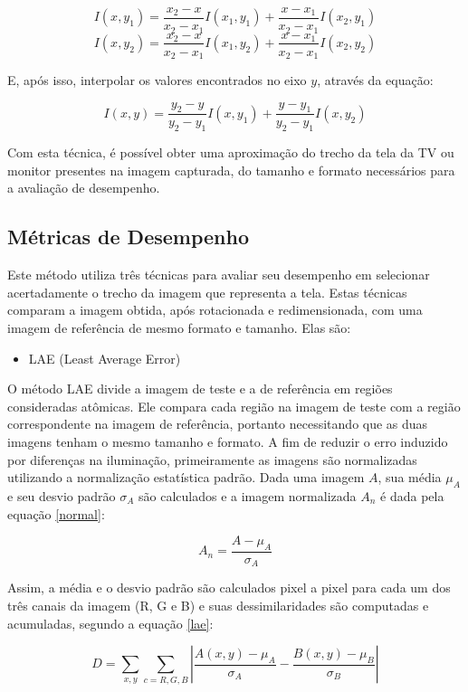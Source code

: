 $$ I(x,y_1) = \frac{x_2-x}{x_2-x_1}I(x_1,y_1) + \frac{x-x_1}{x_2-x_1}I(x_2,y_1) $$
$$ I(x,y_2) = \frac{x_2-x}{x_2-x_1}I(x_1,y_2) + \frac{x-x_1}{x_2-x_1}I(x_2,y_2) $$

E, após isso, interpolar os valores encontrados no eixo $y$, através da equação:

$$ I(x,y) = \frac{y_2-y}{y_2-y_1}I(x,y_1) + \frac{y-y_1}{y_2-y_1}I(x,y_2)$$

Com esta técnica, é possível obter uma aproximação do trecho da tela da TV ou monitor presentes na imagem capturada, do tamanho e formato necessários para a avaliação de desempenho.

\subsection{Métricas de Desempenho}

Este método utiliza três técnicas para avaliar seu desempenho em selecionar acertadamente o trecho da imagem que representa a tela. Estas técnicas comparam a imagem obtida, após rotacionada e redimensionada, com uma imagem de referência de mesmo formato e tamanho. Elas são:

\begin{itemize}
\item LAE (Least Average Error)
\end{itemize}


O método LAE divide a imagem de teste e a de referência em regiões consideradas atômicas. Ele compara cada região na imagem de teste com a região correspondente na imagem de referência, portanto necessitando que as duas imagens tenham o mesmo tamanho e formato. A fim de reduzir o erro induzido por diferenças na iluminação, primeiramente as imagens são normalizadas utilizando a normalização estatística padrão. Dada uma imagem $A$, sua média $\mu_A$ e seu desvio padrão $\sigma_A$ são calculados e a imagem normalizada $A_n$ é dada pela equação \ref{normal}:

\begin{equation}
A_n = \frac{A-\mu_A}{\sigma_A} \label{normal}
\end{equation}

Assim, a média e o desvio padrão são calculados pixel a pixel para cada um dos três canais da imagem (R, G e B) e suas dessimilaridades são computadas e acumuladas, segundo a equação \ref{lae}:

\begin{equation}
D = \sum_ {x,y}^{} \sum_{c=R,G,B}^{} \left | \frac{A(x,y)-\mu _A}{\sigma _A} - \frac{B(x,y)-\mu _B}{\sigma _B} \right |
\label{lae}
\end{equation}

